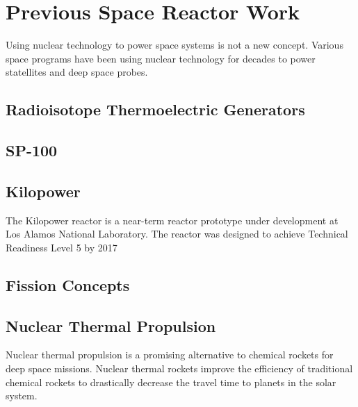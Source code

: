 \section{Previous Space Reactor Work}
Using nuclear technology to power space systems is not a new concept. Various
space programs have been using nuclear technology for decades to power
statellites and deep space probes.

\subsection{Radioisotope Thermoelectric Generators}

\subsection{SP-100}

\subsection{Kilopower}
The Kilopower reactor is a near-term reactor prototype under development at Los
Alamos National Laboratory. The reactor was designed to achieve Technical
Readiness Level 5 by 2017 \citep{MCNP_citation}

\subsection{Fission Concepts}

\subsection { Nuclear Thermal Propulsion }

Nuclear thermal propulsion is a promising alternative to chemical rockets for
deep space missions. Nuclear thermal rockets improve the efficiency of
traditional chemical rockets to drastically decrease the travel time to planets
in the solar system. 
